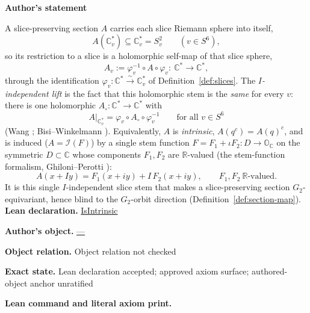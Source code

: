 \documentclass[11pt]{article}
\newcommand{\OO}{\mathbb{O}}
\newcommand{\CC}{\mathbb{C}}
\newcommand{\RR}{\mathbb{R}}
\newcommand{\Cstar}{\CC^{*}}
\providecommand{\Gtwo}{G_2}
\theoremstyle{plain}
\theoremstyle{definition}
\theoremstyle{remark}
\begin{document}
\begin{tcolorbox}[provenancecard,title={26. Definition - Slice restriction and the \$I\$-independent lift; \textbackslash{}protect\{\textbackslash{}cite[Rem.\textasciitilde{}2.11]\{Wang\}; \textbackslash{}cite[\textbackslash{}S3.3,\textasciitilde{}\textbackslash{}S3.7]\{BisiWinkelmann\}; \textbackslash{}cite[Def.\textasciitilde{}2.1, Prop.\textasciitilde{}2.2]\{SeriesExp\}\}},title after break={26. Definition - Slice restriction and the \$I\$-independent lift; \textbackslash{}protect\{\textbackslash{}cite[Rem.\textasciitilde{}2.11]\{Wang\}; \textbackslash{}cite[\textbackslash{}S3.3,\textasciitilde{}\textbackslash{}S3.7]\{BisiWinkelmann\}; \textbackslash{}cite[Def.\textasciitilde{}2.1, Prop.\textasciitilde{}2.2]\{SeriesExp\}\} (continued)}]
\textbf{Author's statement}\par
A slice-preserving section $A$ carries each slice Riemann sphere into itself,
\[
  A(\CC_v^{*})\subseteq\CC_v^{*}=S^2_v\qquad(v\in S^6),
\]
so its restriction to a slice is a holomorphic self-map of that slice sphere,
\[
  A_v:=\varphi_v^{-1}\circ A\circ\varphi_v:\ \Cstar\longrightarrow\Cstar,
\]
through the identification $\varphi_v:\Cstar\xrightarrow{\sim}\CC_v^{*}$ of
Definition~\ref{def:slices}. The \emph{$I$-independent lift} is the fact that this holomorphic stem is
the \emph{same} for every $v$: there is one holomorphic $A_\circ:\Cstar\to\Cstar$ with
\[
  A|_{\CC_v^{*}}=\varphi_v\circ A_\circ\circ\varphi_v^{-1}\qquad\text{for all }v\in S^6
\]
(Wang \cite[Rem.~2.11]{Wang}; Bisi--Winkelmann \cite[\S3.7]{BisiWinkelmann}). Equivalently, $A$ is
\emph{intrinsic}, $A(q^c)=A(q)^c$, and is induced ($A=\mathcal I(F)$) by a single stem function
$F=F_1+\iota F_2:D\to\OO_{\CC}$ on the symmetric $D\subset\CC$ whose components $F_1,F_2$ are
$\RR$-valued (the stem-function formalism, Ghiloni--Perotti \cite[Def.~2.1, Prop.~2.2]{SeriesExp}):
\[
  A(x+Iy)=F_1(x+iy)+I\,F_2(x+iy),\qquad F_1,F_2\ \RR\text{-valued}.
\]
It is this single $I$-independent slice stem that makes a slice-preserving section
$\Gtwo$-equivariant, hence blind to the $\Gtwo$-orbit direction
(Definition~\ref{def:section-map}).
\tcblower
\textbf{Lean declaration.} \url{IsIntrinsic}
\par\textbf{Author's object.} \url{—}
\par\textbf{Object relation.} Object relation not checked
\par\textbf{Exact state.} Lean declaration accepted; approved axiom surface; authored-object anchor unratified
\par\smallskip\textbf{Lean command and literal axiom print.}

\end{tcolorbox}
\end{document}
